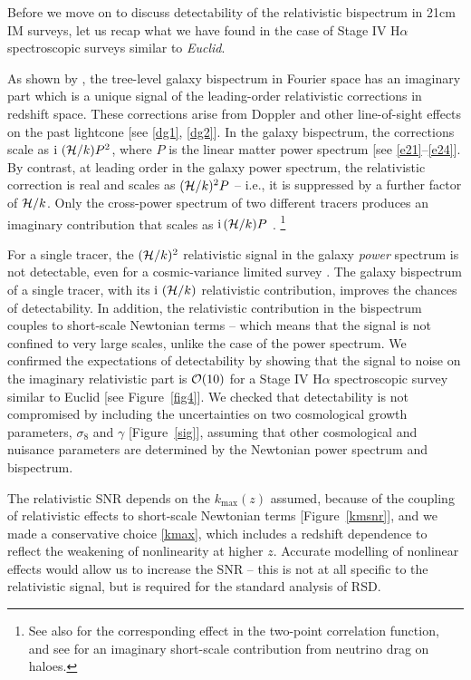 Before we move on to discuss detectability of the relativistic bispectrum in 21cm IM surveys, let us recap what we have found in the case of Stage IV H$\alpha$ spectroscopic surveys similar to \emph{Euclid}.

As shown by \cite{Clarkson:2018dwn}, the tree-level galaxy bispectrum in Fourier space has an imaginary part which is a unique signal of the leading-order relativistic corrections in redshift space. These corrections arise from Doppler and other line-of-sight effects on the past lightcone [see \eqref{dg1}, \eqref{dg2}]. In the galaxy bispectrum, the corrections scale as ${\mathrm{i\,}}\,(\mathcal{H}/k)P^2$, where $P$ is the linear matter power spectrum [see \eqref{e21}--\eqref{e24}]. By contrast,  at leading order in the galaxy power spectrum, the relativistic correction is real and scales as $(\mathcal{H}/k)^2P$ -- i.e., it is suppressed by a further factor of  $\mathcal{H}/k$. 
Only the cross-power spectrum of two different tracers produces an imaginary contribution that scales as ${\mathrm{i\,}}(\mathcal{H}/k)P$ \cite{McDonald:2009dh}.
\footnote{See also \cite{Bonvin:2013ogt, Bonvin:2015kuc, Gaztanaga:2015jrs, Irsic:2015nla, Hall:2016bmm,Lepori:2017twd,Bonvin:2018ckp, Lepori:2019cqp} for the corresponding effect in the two-point correlation function, and see \cite{Okoli:2016vmd} for an imaginary {short-scale} contribution from neutrino drag on haloes.}


For a single tracer, the $(\mathcal{H}/k)^{2}$ relativistic signal in the galaxy {\em power} spectrum is not detectable, even for a cosmic-variance limited survey \cite{Alonso:2015uua}.
The galaxy bispectrum of a single tracer, with its ${\mathrm{i\,}}\,(\mathcal{H}/k)$ relativistic contribution, improves the chances of detectability. In addition, the relativistic contribution in the bispectrum couples to short-scale Newtonian terms -- which means that the signal is not confined to very large scales, unlike the case of the power spectrum. We confirmed the expectations of detectability by showing that the signal to noise on the imaginary relativistic part is ${\cal O}(10)$ for a Stage IV H$\alpha$ spectroscopic survey similar to Euclid [see Figure~\ref{fig4}].  We checked that detectability is not compromised by including the uncertainties on two cosmological growth parameters, $\sigma_8$ and $\gamma$ [Figure~\ref{sig}], assuming that other cosmological  and nuisance parameters are determined by the Newtonian power spectrum and bispectrum. 


The relativistic SNR depends on the $k_{\mathrm{max}}(z)$ assumed, because of the coupling of relativistic effects to short-scale Newtonian terms [Figure~\ref{kmsnr}], and  we made a conservative choice \eqref{kmax}, which includes a redshift dependence to reflect the weakening of nonlinearity at higher $z$. 
Accurate modelling of nonlinear effects would allow us to increase the SNR  
 -- this is not at all specific to the relativistic signal,  but is required for the standard analysis of RSD.


